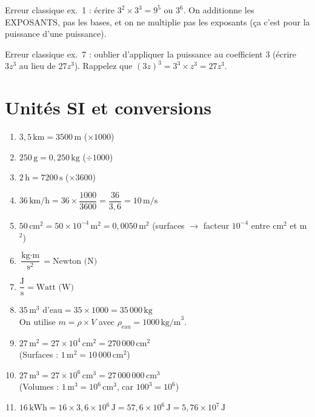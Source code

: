 \documentclass[11pt,a4paper]{article}
\newcommand{\corrbox}[1]{
\begin{tcolorbox}[colback=correctgreen!8!white,colframe=correctgreen!60!black]
#1
\end{tcolorbox}
}
\newcommand{\warnbox}[1]{
\begin{tcolorbox}[colback=warnred!8!white,colframe=warnred!60!black,title=\textbf{Erreurs fr\'equentes}]
#1
\end{tcolorbox}
}
\begin{document}
\warnbox{
Erreur classique ex.~1 : \'ecrire $3^{2} \times 3^{3} = 9^{5}$ ou $3^{6}$. On additionne les EXPOSANTS, pas les bases, et on ne multiplie pas les exposants (\c ca c'est pour la puissance d'une puissance).

\vspace{0.2cm}
Erreur classique ex.~7 : oublier d'appliquer la puissance au coefficient $3$ (\'ecrire $3z^{3}$ au lieu de $27z^{3}$). Rappelez que $(3z)^{3} = 3^{3} \times z^{3} = 27z^{3}$.
}

\section{Unit\'es SI et conversions}

\corrbox{
\begin{enumerate}
\item $3{,}5\,\text{km} = 3500\,\text{m}$ \quad ($\times 1000$)
\item $250\,\text{g} = 0{,}250\,\text{kg}$ \quad ($\div 1000$)
\item $2\,\text{h} = 7200\,\text{s}$ \quad ($\times 3600$)
\item $36\,\text{km/h} = 36 \times \dfrac{1000}{3600} = \dfrac{36}{3{,}6} = 10\,\text{m/s}$
\item $50\,\text{cm}^{2} = 50 \times 10^{-4}\,\text{m}^{2} = 0{,}0050\,\text{m}^{2}$ \quad (surfaces $\rightarrow$ facteur $10^{-4}$ entre cm$^{2}$ et m$^{2}$)
\item $\dfrac{\text{kg} \cdot \text{m}}{\text{s}^{2}} = \text{Newton (N)}$
\item $\dfrac{\text{J}}{\text{s}} = \text{Watt (W)}$
\item $35\,\text{m}^{3} \text{ d'eau} = 35 \times 1000 = 35\,000\,\text{kg}$\\[0.1cm]
On utilise $m = \rho \times V$ avec $\rho_{\text{eau}} = 1000\,\text{kg/m}^{3}$.
\item $27\,\text{m}^{2} = 27 \times 10^{4}\,\text{cm}^{2} = 270\,000\,\text{cm}^{2}$\\[0.1cm]
(Surfaces : $1\,\text{m}^{2} = 10\,000\,\text{cm}^{2}$)
\item $27\,\text{m}^{3} = 27 \times 10^{6}\,\text{cm}^{3} = 27\,000\,000\,\text{cm}^{3}$\\[0.1cm]
(Volumes : $1\,\text{m}^{3} = 10^{6}\,\text{cm}^{3}$, car $100^{3} = 10^{6}$)
\item $16\,\text{kWh} = 16 \times 3{,}6 \times 10^{6}\,\text{J} = 57{,}6 \times 10^{6}\,\text{J} = 5{,}76 \times 10^{7}\,\text{J}$
\end{enumerate}
}
\end{document}
